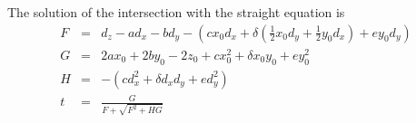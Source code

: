 \documentclass[12pt,a4paper,twoside,openright,BCOR10mm,headsepline,titlepage,abstracton,chapterprefix,final]{scrreprt}
\begin{document}
%
%
%
The solution of the intersection with the straight equation is
\begin{eqnarray}
 F &=& d_z - a d_x - b d_y - \left( c x_0 d_x + \delta \left( \frac{1}{2} x_0 d_y + \frac{1}{2} y_0 d_x \right)  + e y_0 d_y \right)   \\
 G &=&  2 a x_0 + 2 b y_0 - 2 z_0 + c x_0^2 + \delta x_0 y_0 + e y_0^2 \\
 H &=& - \left( c d_x^2 + \delta d_x d_y + e d_y^2 \right) \\
 t &=& \frac{G}{ F + \sqrt{F^2 + H G} }
 \label{eq:quadratic_form_t}
\end{eqnarray}
\end{document}

